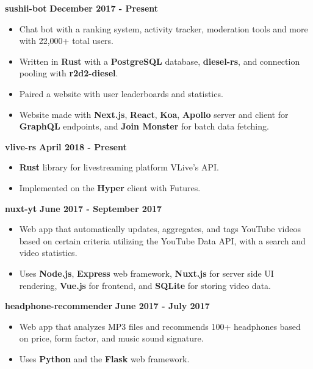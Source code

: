\documentclass{res}
\begin{document}
\begin{resume}
		{\bf sushii-bot} \hfill {\bf December 2017 - Present} \\
			\vspace{-3.5mm}
			\begin{itemize} \itemsep -2pt
				\item Chat bot with a ranking system, activity tracker, moderation tools and more with 22,000+ total users.
				\item Written in {\bf Rust} with a {\bf PostgreSQL} database, {\bf diesel-rs}, and connection pooling with {\bf r2d2-diesel}.
				\item Paired a website with user leaderboards and statistics.
				\item Website made with {\bf Next.js}, {\bf React}, {\bf Koa}, {\bf Apollo} server and client for {\bf GraphQL} endpoints,
					and {\bf Join Monster} for batch data fetching.
			\end{itemize}
		
		{\bf vlive-rs} \hfill {\bf April 2018 - Present} \\
			\vspace{-3.5mm}
			\begin{itemize} \itemsep -2pt
				\item {\bf Rust} library for livestreaming platform VLive's API.
				\item Implemented on the {\bf Hyper} client with Futures.
			\end{itemize}

		{\bf nuxt-yt} \hfill {\bf June 2017 - September 2017} \\
			\vspace{-3.5mm}
			\begin{itemize} \itemsep -2pt
				\item Web app that automatically updates, aggregates, and tags YouTube videos based on certain criteria utilizing the YouTube Data API,
					with a search and video statistics.
				\item Uses {\bf Node.js}, {\bf Express} web framework, {\bf Nuxt.js} for server side 
					UI rendering, {\bf Vue.js} for frontend, and {\bf SQLite} for storing video data.
			\end{itemize}

		{\bf headphone-recommender} \hfill {\bf June 2017 - July 2017} \\
			\vspace{-3.5mm}
			\begin{itemize}	\itemsep -2pt
				\item Web app that analyzes MP3 files and recommends 100+ headphones based on price, form factor, and music sound signature.
				\item Uses {\bf Python} and the {\bf Flask} web framework.
			\end{itemize}
		

\end{resume}
\end{document}
